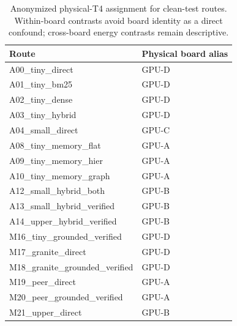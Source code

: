 \begin{table}[t]
\caption{Anonymized physical-T4 assignment for clean-test routes. Within-board contrasts avoid board identity as a direct confound; cross-board energy contrasts remain descriptive.}
\label{tab:hardware}
\centering
\scriptsize
\begin{tabular}{@{}ll@{}}
\toprule
Route & Physical board alias \\
\midrule
A00\_tiny\_direct & GPU-D \\
A01\_tiny\_bm25 & GPU-D \\
A02\_tiny\_dense & GPU-D \\
A03\_tiny\_hybrid & GPU-D \\
A04\_small\_direct & GPU-C \\
A08\_tiny\_memory\_flat & GPU-A \\
A09\_tiny\_memory\_hier & GPU-A \\
A10\_tiny\_memory\_graph & GPU-A \\
A12\_small\_hybrid\_both & GPU-B \\
A13\_small\_hybrid\_verified & GPU-B \\
A14\_upper\_hybrid\_verified & GPU-B \\
M16\_tiny\_grounded\_verified & GPU-D \\
M17\_granite\_direct & GPU-D \\
M18\_granite\_grounded\_verified & GPU-D \\
M19\_peer\_direct & GPU-A \\
M20\_peer\_grounded\_verified & GPU-A \\
M21\_upper\_direct & GPU-B \\
\bottomrule
\end{tabular}
\end{table}
